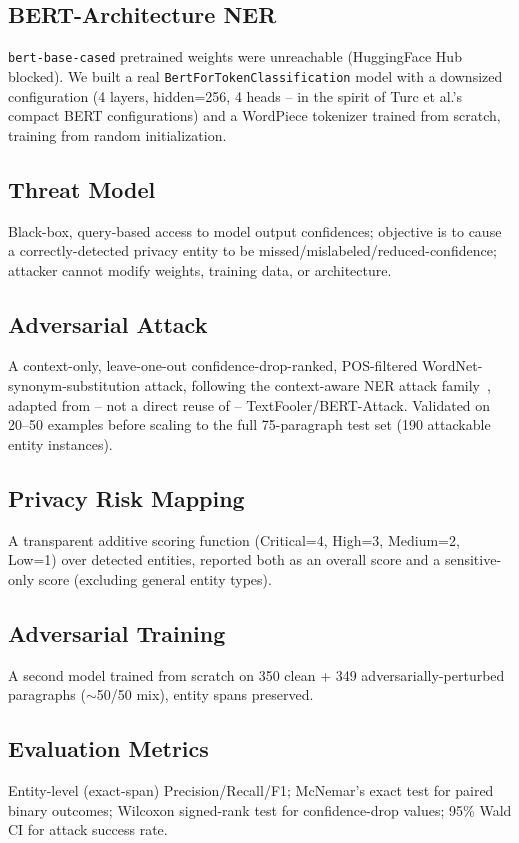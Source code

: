 \documentclass[conference]{IEEEtran}
\begin{document}
\subsection{BERT-Architecture NER}
\texttt{bert-base-cased} pretrained weights were unreachable (HuggingFace Hub blocked). We built a real \texttt{BertForTokenClassification} model with a downsized configuration (4 layers, hidden=256, 4 heads -- in the spirit of Turc et al.'s~\cite{turc2019wellread} compact BERT configurations) and a WordPiece tokenizer trained from scratch, training from random initialization.

\subsection{Threat Model}
Black-box, query-based access to model output confidences; objective is to cause a correctly-detected privacy entity to be missed/mislabeled/reduced-confidence; attacker cannot modify weights, training data, or architecture.

\subsection{Adversarial Attack}
A context-only, leave-one-out confidence-drop-ranked, POS-filtered WordNet-synonym-substitution attack, following the context-aware NER attack family~\cite{lin2021rockner,simoncini2021seqattack}, adapted from -- not a direct reuse of -- TextFooler/BERT-Attack. Validated on 20--50 examples before scaling to the full 75-paragraph test set (190 attackable entity instances).

\subsection{Privacy Risk Mapping}
A transparent additive scoring function (Critical=4, High=3, Medium=2, Low=1) over detected entities, reported both as an overall score and a sensitive-only score (excluding general entity types).

\subsection{Adversarial Training}
A second model trained from scratch on 350 clean + 349 adversarially-perturbed paragraphs ($\sim$50/50 mix), entity spans preserved.

\subsection{Evaluation Metrics}
Entity-level (exact-span) Precision/Recall/F1; McNemar's exact test for paired binary outcomes; Wilcoxon signed-rank test for confidence-drop values; 95\% Wald CI for attack success rate.
\end{document}
